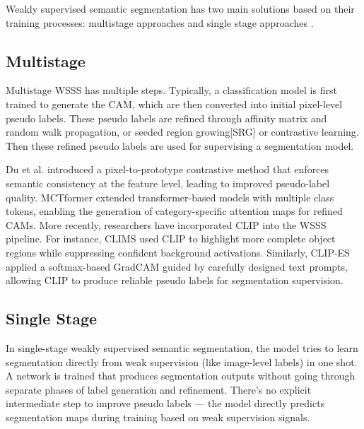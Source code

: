 Weakly supervised semantic segmentation has two main solutions based on their training processes: multistage approaches \cite{instance_wsss,wsss_L2G,wsss_rib} and single stage approaches \cite{wsss_reliability_does_matter, wsss_afa_affinity_from_attention}.

\subsection{Multistage}
\label{subsec:multi-stage}

Multistage WSSS has multiple steps. Typically, a classification model is first trained to generate the CAM,  which are then converted into initial pixel-level pseudo labels. These pseudo labels are refined through affinity matrix and random walk propagation\cite{wsss_affinitynet, wsss_afa_affinity_from_attention}, or seeded region growing[SRG] or contrastive learning. Then these refined pseudo labels are used for supervising a segmentation model.

Du et al. \cite{pixel_to_prototype} introduced a pixel-to-prototype contrastive method that enforces semantic consistency at the feature level, leading to improved pseudo-label quality. MCTformer \cite{wsss_MCTformer} extended transformer-based models with multiple class tokens, enabling the generation of category-specific attention maps for refined CAMs. More recently, researchers have incorporated CLIP into the WSSS pipeline. For instance, CLIMS \cite{wsss_clims} used CLIP to highlight more complete object regions while suppressing confident background activations. Similarly, CLIP-ES \cite{wsss_clip_es} applied a softmax-based GradCAM \cite{cam_grad} guided by carefully designed text prompts, allowing CLIP to produce reliable pseudo labels for segmentation supervision.

\subsection{Single Stage}
\label{subsec:single-stage}

In single-stage weakly supervised semantic segmentation, the model tries to learn segmentation directly from weak supervision (like image-level labels) in one shot. A network is trained that produces segmentation outputs without going through separate phases of label generation and refinement. There's no explicit intermediate step to improve pseudo labels — the model directly predicts segmentation maps during training based on weak supervision signals.

